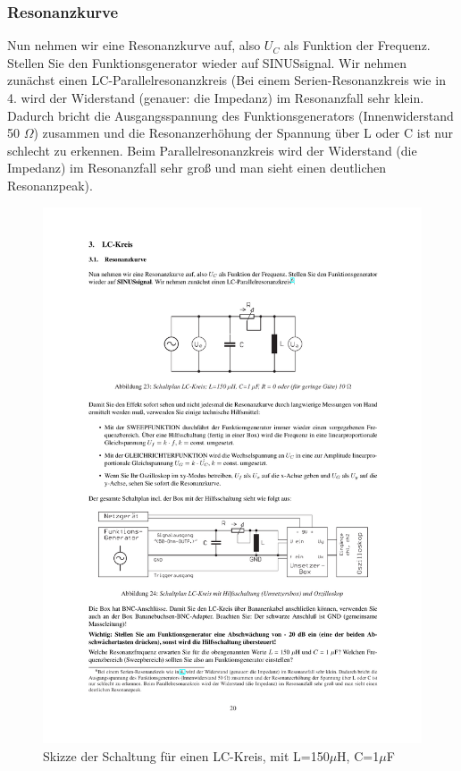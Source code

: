\documentclass[12pt]{scrartcl}
\begin{document}
\subsubsection{Resonanzkurve} 
Nun nehmen wir eine Resonanzkurve auf, also $U_C$ als Funktion der Frequenz. Stellen Sie den Funktionsgenerator wieder auf SINUSsignal. Wir nehmen zunächst einen LC-Parallelresonanzkreis (Bei einem Serien-Resonanzkreis wie in 4. wird der Widerstand (genauer: die Impedanz) im Resonanzfall sehr klein. Dadurch bricht die Ausgangsspannung des Funktionsgenerators (Innenwiderstand 50
$\Omega$) zusammen und die Resonanzerhöhung der Spannung über L oder C ist
nur schlecht zu erkennen. Beim Parallelresonanzkreis wird der Widerstand (die Impedanz) im Resonanzfall sehr groß und man sieht einen deutlichen Resonanzpeak).
\begin{figure}[htbp] 
  \centering
    \includegraphics[trim = 20mm 200mm 1mm 50mm, clip, scale = 1]{LC_kreis.pdf}
  	\caption[Skizze der Schaltung für einen LC-Kreis, mit L=150$\mu$H, C=1$\mu$F]{Skizze der Schaltung für einen LC-Kreis, mit L=150$\mu$H, C=1$\mu$F\footnotemark}
  \label{fig:LC-Kreis}
\end{figure}
\end{document}
